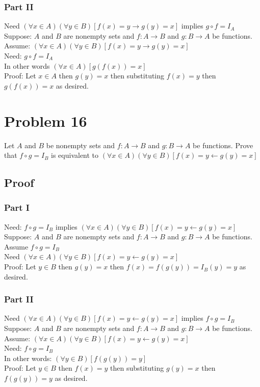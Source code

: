 \documentclass{article}
\begin{document}
\subsubsection*{Part II}
Need $(\forall x \in A)(\forall y \in B)[f(x) = y \rightarrow g(y) = x]$ implies $g \circ f = I_A$\\
Suppose: $A$ and $B$ are nonempty sets and $f: A \rightarrow B$ and $g: B \rightarrow A$ be functions. \\
Assume: $(\forall x \in A)(\forall y \in B)[f(x) = y \rightarrow g(y) = x]$\\ 
Need: $g \circ f = I_A$\\
In other words $(\forall x \in A)[g(f(x)) = x]$\\
Proof: Let $x \in A$ then $g(y) = x$ then substituting $f(x) = y$ then $g(f(x)) = x$ as desired.

\section*{Problem 16}
Let $A$ and $B$ be nonempty sets and $f: A \rightarrow B$ and $g: B \rightarrow A$ be functions. Prove that $f \circ g = I_B$ is equivalent to $(\forall x \in A)(\forall y \in B)[f(x) = y \leftarrow g(y) = x]$
\subsection*{Proof}
\subsubsection*{Part I}
Need: $f \circ g = I_B$ implies $(\forall x \in A)(\forall y \in B)[f(x) = y \leftarrow g(y) = x]$\\
Suppose: $A$ and $B$ are nonempty sets and $f: A \rightarrow B$ and $g: B \rightarrow A$ be functions. \\
Assume $f \circ g = I_B$\\
Need $(\forall x \in A)(\forall y \in B)[f(x) = y \leftarrow g(y) = x]$\\
Proof: Let $y \in B$ then $g(y) = x$ then $f(x) = f(g(y)) = I_B(y) = y$ as desired.
\subsubsection*{Part II}
Need $(\forall x \in A)(\forall y \in B)[f(x) = y \leftarrow g(y) = x]$ implies $f \circ g = I_B$\\
Suppose: $A$ and $B$ are nonempty sets and $f: A \rightarrow B$ and $g: B \rightarrow A$ be functions. \\
Assume: $(\forall x \in A)(\forall y \in B)[f(x) = y \leftarrow g(y) = x]$\\
Need: $f \circ g = I_B$\\
In other words: $(\forall y \in B)[f(g(y)) = y]$\\
Proof: Let $y \in B$ then $f(x) = y$ then substituting $g(y) = x$ then $f(g(y)) = y$ as desired.
\end{document}
